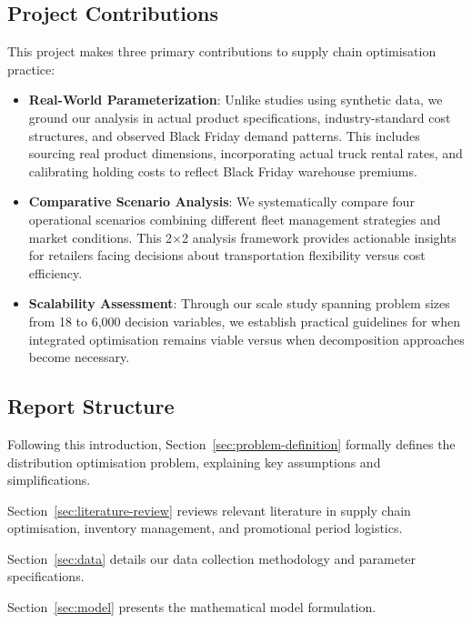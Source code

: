 \documentclass[a4paper,12pt]{article}
\begin{document}
\subsection{Project Contributions}\label{subsec:project-contributions}

This project makes three primary contributions to supply chain optimisation practice:
\begin{itemize}
    \item \textbf{Real-World Parameterization}: Unlike studies using synthetic data, we ground our analysis in actual product specifications, industry-standard cost structures, and observed Black Friday demand patterns.
This includes sourcing real product dimensions, incorporating actual truck rental rates, and calibrating holding costs to reflect Black Friday warehouse premiums.

    \item \textbf{Comparative Scenario Analysis}: We systematically compare four operational scenarios combining different fleet management strategies and market conditions.
This 2×2 analysis framework provides actionable insights for retailers facing decisions about transportation flexibility versus cost efficiency.

    \item \textbf{Scalability Assessment}: Through our scale study spanning problem sizes from 18 to 6,000 decision variables, we establish practical guidelines for when integrated optimisation remains viable versus when decomposition approaches become necessary.

\end{itemize}

\subsection{Report Structure}\label{subsec:report-structure}

Following this introduction, Section~\ref{sec:problem-definition} formally defines the distribution optimisation problem, explaining key assumptions and simplifications.

Section~\ref{sec:literature-review} reviews relevant literature in supply chain optimisation, inventory management, and promotional period logistics.

Section~\ref{sec:data} details our data collection methodology and parameter specifications.

Section~\ref{sec:model} presents the mathematical model formulation.
\end{document}
